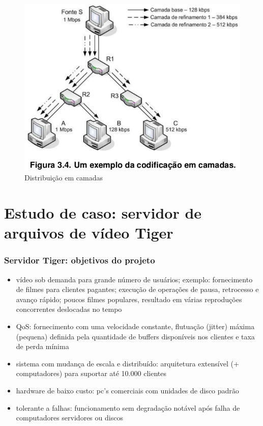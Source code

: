 \documentclass[]{beamer}
\begin{document}
\begin{frame}
  \begin{figure}[hbtp]
  \caption{Distribuição em camadas\cite{Moraes:2009}}
  \begin{center}
   \includegraphics[scale=0.35]{distribuicao_camadas.png}
  \end{center}
  \end{figure}
\end{frame}


\section{Estudo de caso: servidor de arquivos de vídeo Tiger}

\begin{frame}
 \frametitle{Servidor Tiger: objetivos do projeto}
 \begin{itemize}
   \item vídeo sob demanda para grande número de usuários; exemplo: fornecimento de filmes
para clientes pagantes; execução de operações de pausa, retrocesso e avanço rápido; poucos filmes
populares, resultado em várias reproduções concorrentes deslocadas no tempo
   \item QoS: fornecimento com uma velocidade constante, flutuação (jitter) máxima (pequena)
definida pela quantidade de buffers disponíveis nos clientes e taxa de perda mínima
   \item sistema com mudança de escala e distribuído: arquitetura extensível 
(+ computadores) para suportar até 10.000 clientes
   \item hardware de baixo custo: pc's comerciais com unidades de disco padrão
   \item tolerante a falhas: funcionamento sem degradação notável após falha de computadores 
servidores ou discos
  \end{itemize}
\end{frame}
\end{document}
